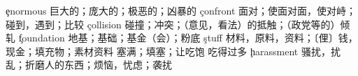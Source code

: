 \begin{multicols}{2}
\c{enormous}  \a 巨大的；庞大的；极恶的；凶暴的
\c{confront}  \vt 面对；使面对面，使对峙；碰到，遇到；比较
\c{collision}  \n 碰撞；冲突；（意见，看法）的抵触；（政党等的）倾轧
\c{foundation}  \n 地基；基础；基金（会）；粉底
\c{stuff}  \n 材料，原料，资料；〔俚〕钱，现金；填充物；素材资料 \vt 塞满；填塞；让吃饱 \vi 吃得过多
\c{harassment}  \n 骚扰，扰乱；折磨人的东西；烦恼，忧虑；袭扰
\end{multicols}
